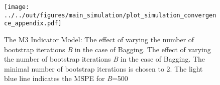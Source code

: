 \begin{figure}[t]
\centering
\texttt{[image: ../../out/figures/main\_simulation/plot\_simulation\_convergence\_appendix.pdf]}
\caption[]{The M3 Indicator Model: The effect of varying the number of bootstrap iterations \textit{B} in the case of Bagging. The effect of varying the number of bootstrap iterations \textit{B} in the case of Bagging. The minimal number of bootstrap iterations is chosen to 2. The light blue line indicates the MSPE for \textit{B}=500}
\end{figure}
